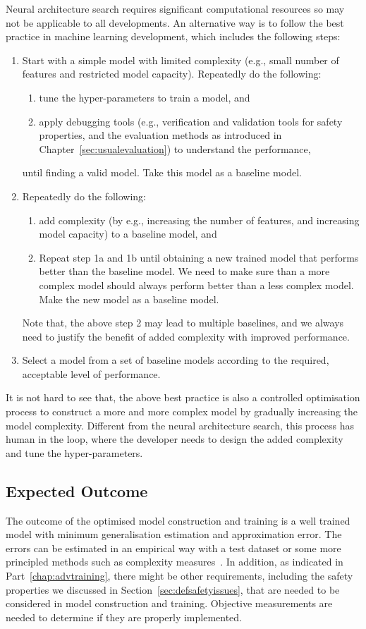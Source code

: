 Neural architecture search requires significant computational resources so may not be applicable to all developments. An alternative way is to follow the best practice in machine learning development, which includes the following steps: 
\begin{enumerate}
    \item Start with a simple model with limited complexity (e.g., small number of features and restricted model capacity). Repeatedly do the following: 
    \begin{enumerate}
        \item tune the hyper-parameters to train a model, and 
        \item apply debugging tools (e.g., verification and validation tools for safety properties, and the evaluation methods as introduced in Chapter~\ref{sec:usualevaluation}) to understand the performance, 
    \end{enumerate}  
    until finding a valid model. Take this model as a baseline model. 
    \item Repeatedly do the following: 
    \begin{enumerate}
        \item add complexity (by e.g., increasing the number of features, and increasing model capacity) to a baseline model, and 
        \item Repeat step 1a and 1b until obtaining a new trained model that performs better than the baseline model. We need to make sure than a more complex model should always perform better than a less complex model. Make the new model as a baseline model.     
    \end{enumerate}
    Note that, the above step 2 may lead to multiple baselines, and we always need to justify the benefit of added complexity with improved performance. 
    \item Select a model from a set of baseline models according to the required, acceptable level of performance. 
\end{enumerate}

It is not hard to see that, the above best practice is also a controlled optimisation process to construct a more and more complex model by gradually increasing the model complexity. Different from the neural architecture search, this process has human in the loop, where the developer needs to design the added complexity and tune the hyper-parameters. 


\subsection*{Expected Outcome}

The outcome of the optimised model construction and training is a well trained model with minimum generalisation estimation and approximation error. The errors can be estimated in an empirical way with a test dataset or some more principled methods such as complexity measures~\cite{jin2020does}. In addition, as indicated in Part~\ref{chap:advtraining}, there might be other requirements, including the safety properties we discussed in Section~\ref{sec:defsafetyissues}, that are needed to be considered in model construction and training. Objective measurements are needed to determine if they are properly implemented.   